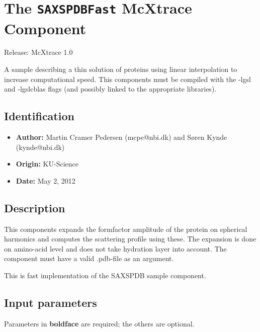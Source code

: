 \section{The \texttt{SAXSPDBFast} McXtrace Component}
Release: McXtrace 1.0

A sample describing a thin solution of proteins using linear interpolation
to increase computational speed. This components must be compiled with the
-lgsl and -lgslcblas flags (and possibly linked to the appropriate libraries).

\subsection*{Identification}
\begin{itemize}
  \item \textbf{Author:} Martin Cramer Pedersen (mcpe@nbi.dk) and Søren Kynde (kynde@nbi.dk)
  \item \textbf{Origin:} KU-Science
  \item \textbf{Date:} May 2, 2012
\end{itemize}

\subsection*{Description}
This components expands the formfactor amplitude of the protein on spherical harmonics and computes the scattering profile using these. The expansion is done on amino-acid level and does not take hydration layer into account. The component must have a valid .pdb-file as an argument.

This is fast implementation of the SAXSPDB sample component.

\subsection*{Input parameters}
Parameters in \textbf{boldface} are required; the others are optional.


